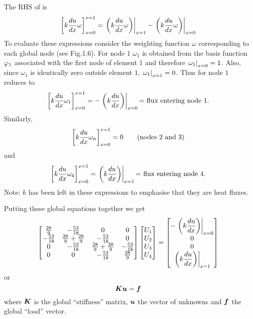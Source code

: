 The RHS of  is 
\begin{equation}
   \displaystyle\left[ k \dfrac{ d u}{d x} \omega \right]_{x=0}^{x=1} = \left. \left( k \dfrac{ d u}{d x} \omega \right) \right|_{x=1} 
    - \left. \left( k \dfrac{ d u}{d x} \omega \right) \right|_{x=0} 
  \label{eqn:a1}
\end{equation}
To evaluate these expressions consider the weighting function $\omega$
corresponding to each global node (see Fig.1.6). For node $1$ $\omega_{1}$ is
obtained from the basis function $ \varphi_{1} $ associated with the first node of
element $1$ and therefore $ \left. \omega_{1} \right|_{x=0} =1$. Also, since $\omega_{1}$ is
identically zero outside element $1$, $ \left. \omega_{1} \right|_{x=1} =0$. Thus
 for node $1$ reduces to
\begin{equation*}
   \displaystyle\left[ k \dfrac{ d u}{d x} \omega_{1} \right]_{x=0}^{x=1} =- \left. \left( k \dfrac{ d u}{d x}  \right) \right|_{x=0} 
    \text{= flux entering node $1$.}
\end{equation*}
Similarly,
\begin{equation*}
   \displaystyle\left[ k \dfrac{ d u}{d x} \omega_{n} \right]_{x=0}^{x=1} =0\quad\quad\text{(nodes $2$ and $3$)}
\end{equation*}
and
\begin{equation*}
   \displaystyle\left[ k \dfrac{ d u}{d x} \omega_{4} \right]_{x=0}^{x=1} = \left. \left( k \dfrac{ d u}{d x}  \right) \right|_{x=1} 
    \mbox{= flux entering node $4$.}
\end{equation*}
Note: $k$ has been left in these expressions to emphasise that they are heat 
fluxes.

Putting these global equations together we get
\begin{equation}
  \begin{bmatrix}    
    \frac{28}{9} & -\frac{53}{18} & 0 & 0 \\
    -\frac{53}{18} & \frac{28}{9}+\frac{28}{9} & -\frac{53}{18} & 0 \\
    0 & -\frac{53}{18} & \frac{28}{9}+\frac{28}{9} & -\frac{53}{18} \\
    0 & 0 &-\frac{53}{18} & \frac{28}{9}
  \end{bmatrix}
  \begin{bmatrix}
    U_{1} \\
    U_{2} \\
    U_{3} \\
    U_{4}
  \end{bmatrix} =
  \begin{bmatrix}
    - \left. \left( k \dfrac{ d u}{d x}  \right) \right|_{x=0}  \\
    0 \\
    0 \\
     \left. \left( k \dfrac{ d u}{d x}  \right) \right|_{x=1} 
  \end{bmatrix}
  \label{eqn:globaleqn}
\end{equation}    
or
\begin{equation*}
  \matr{K}\vect{u}=\vect{f}
\end{equation*}
where $\matr{K}$ is the global ``stiffness'' matrix, $\vect{u}$ the vector of
unknowns and $\vect{f}$ the global ``load'' vector.

